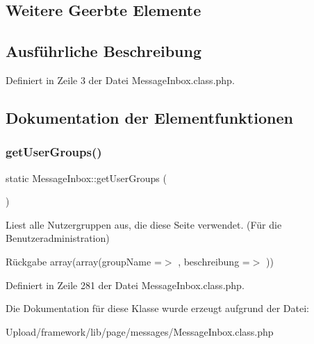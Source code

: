 \subsection*{Weitere Geerbte Elemente}


\subsection{Ausführliche Beschreibung}


Definiert in Zeile 3 der Datei Message\+Inbox.\+class.\+php.



\subsection{Dokumentation der Elementfunktionen}
\mbox{\label{class_message_inbox_a75afd447a938aa1d9cfe75aaa2c7881c}} 
\subsubsection{\texorpdfstring{get\+User\+Groups()}{getUserGroups()}}
{\footnotesize\ttfamily static Message\+Inbox\+::get\+User\+Groups (\begin{DoxyParamCaption}{ }\end{DoxyParamCaption})\hspace{0.3cm}{\ttfamily [static]}}

Liest alle Nutzergruppen aus, die diese Seite verwendet. (Für die Benutzeradministration) \begin{DoxyReturn}{Rückgabe}
array(array(\textquotesingle{}group\+Name\textquotesingle{} =$>$ \textquotesingle{}\textquotesingle{}, \textquotesingle{}beschreibung\textquotesingle{} =$>$ \textquotesingle{}\textquotesingle{})) 
\end{DoxyReturn}


Definiert in Zeile 281 der Datei Message\+Inbox.\+class.\+php.



Die Dokumentation für diese Klasse wurde erzeugt aufgrund der Datei\+:\begin{DoxyCompactItemize}
\item 
Upload/framework/lib/page/messages/Message\+Inbox.\+class.\+php\end{DoxyCompactItemize}

